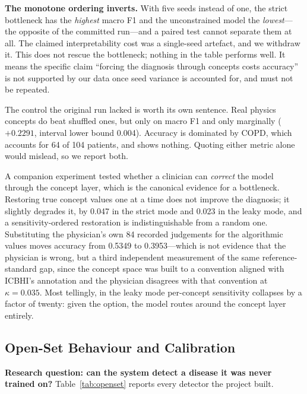 \documentclass[journal,onecolumn]{IEEEtran}
\begin{document}
\textbf{The monotone ordering inverts.} With five seeds instead of one, the strict
bottleneck has the \emph{highest} macro F1 and the unconstrained model the
\emph{lowest}---the opposite of the committed run---and a paired test cannot
separate them at all. The claimed interpretability cost was a single-seed
artefact, and we withdraw it. This does not rescue the bottleneck; nothing in the
table performs well. It means the specific claim ``forcing the diagnosis through
concepts costs accuracy'' is not supported by our data once seed variance is
accounted for, and must not be repeated.

The control the original run lacked is worth its own sentence. Real physics
concepts do beat shuffled ones, but only on macro F1 and only marginally
($+0.2291$, interval lower bound 0.004). Accuracy is dominated by COPD, which
accounts for 64 of 104 patients, and shows nothing. Quoting either metric alone
would mislead, so we report both.

A companion experiment tested whether a clinician can \emph{correct} the model
through the concept layer, which is the canonical evidence for a bottleneck.
Restoring true concept values one at a time does not improve the diagnosis; it
slightly degrades it, by 0.047 in the strict mode and 0.023 in the leaky mode, and
a sensitivity-ordered restoration is indistinguishable from a random one.
Substituting the physician's own 84 recorded judgements for the algorithmic values
moves accuracy from 0.5349 to 0.3953---which is not evidence that the physician is
wrong, but a third independent measurement of the same reference-standard gap, since
the concept space was built to a convention aligned with ICBHI's annotation and
the physician disagrees with that convention at $\kappa = 0.035$. Most tellingly,
in the leaky mode per-concept sensitivity collapses by a factor of twenty: given
the option, the model routes around the concept layer entirely.

\subsection{Open-Set Behaviour and Calibration}
\label{subsec:openset}

\textbf{Research question: can the system detect a disease it was never trained
on?} Table~\ref{tab:openset} reports every detector the project built.
\end{document}
